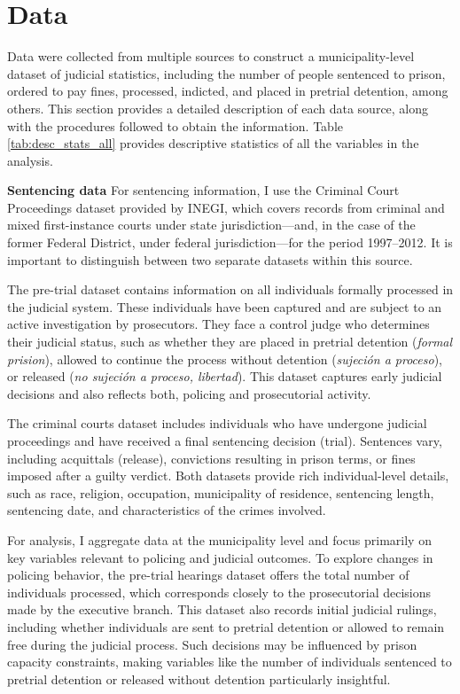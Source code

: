 \section{Data}
\label{sec:data}

Data were collected from multiple sources to construct a municipality-level dataset of judicial statistics, including the number of people sentenced to prison, ordered to pay fines, processed, indicted, and placed in pretrial detention, among others. This section provides a detailed description of each data source, along with the procedures followed to obtain the information. Table \ref{tab:desc_stats_all} provides descriptive statistics of all the variables in the analysis.

\textbf{Sentencing data} For sentencing information, I use the Criminal Court Proceedings dataset provided by INEGI, which covers records from criminal and mixed first-instance courts under state jurisdiction—and, in the case of the former Federal District, under federal jurisdiction—for the period 1997–2012. It is important to distinguish between two separate datasets within this source.

The pre-trial dataset contains information on all individuals formally processed in the judicial system. These individuals have been captured and are subject to an active investigation by prosecutors. They face a control judge who determines their judicial status, such as whether they are placed in pretrial detention (\textit{formal prision}), allowed to continue the process without detention (\textit{sujeción a proceso}), or released (\textit{no sujeción a proceso, libertad}). This dataset captures early judicial decisions and also reflects both, policing and prosecutorial activity.

The criminal courts dataset includes individuals who have undergone judicial proceedings and have received a final sentencing decision (trial). Sentences vary, including acquittals (release), convictions resulting in prison terms, or fines imposed after a guilty verdict. Both datasets provide rich individual-level details, such as race, religion, occupation, municipality of residence, sentencing length, sentencing date, and characteristics of the crimes involved.

For analysis, I aggregate data at the municipality level and focus primarily on key variables relevant to policing and judicial outcomes. To explore changes in policing behavior, the pre-trial hearings dataset offers the total number of individuals processed, which corresponds closely to the prosecutorial decisions made by the executive branch. This dataset also records initial judicial rulings, including whether individuals are sent to pretrial detention or allowed to remain free during the judicial process. Such decisions may be influenced by prison capacity constraints, making variables like the number of individuals sentenced to pretrial detention or released without detention particularly insightful.

